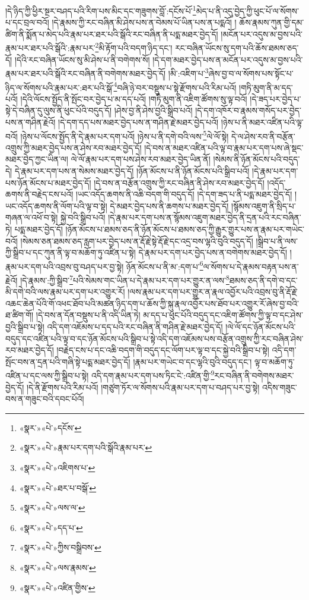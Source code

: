 །དེ་ཉིད་ཀྱི་ཕྱིར་སྔར་བཤད་པའི་རིག་པས་མིང་དང་གཟུགས་བློ་:དངོས་པོ་\footnote{«སྣར་»«པེ་»དངོས་}མེད་པ་ནི་འདུ་བྱེད་ཀྱི་ཕུང་པོ་ལ་སོགས་པ་དང་བྲལ་བའོ། །དེ་རྣམས་ཀྱི་རང་བཞིན་མི་ཤེས་པས་ན་བེམས་པོ་ཡིན་པས་ན་པདྨའོ། །
ཆོས་རྣམས་ཀུན་གྱི་དམ་ཚིག་ནི་སྨོན་པ་མེད་པའི་རྣམ་པར་ཐར་པའི་སྒོའི་རང་བཞིན་ནི་པདྨ་མཐར་བྱེད་དོ། །མངོན་པར་འདུས་མ་བྱས་པའི་རྣམ་པར་ཐར་པའི་སྒོའི་:རྣམ་པར་\footnote{«སྣར་»«པེ་»རྣམ་པར་དག་པའི་སྒོའི་རྣམ་པར་}མི་རྟོག་པའི་བདག་ཉིད་དང་། རང་བཞིན་ཡོངས་སུ་དག་པའི་ཆོས་ཐམས་ཅད་དོ། །དེའི་རང་བཞིན་ཡོངས་སུ་མི་ཤེས་པ་ནི་བགེགས་སོ། །དེ་དག་མཐར་བྱེད་པས་ན་མངོན་པར་འདུས་མ་བྱས་པའི་རྣམ་པར་ཐར་པའི་སྒོའི་རང་བཞིན་ནི་བགེགས་མཐར་བྱེད་དོ། །མི་:འཇིག་པ་\footnote{«སྣར་»«པེ་»འཇིགས་པ་}ཞེས་བྱ་བ་ལ་སོགས་པས་སྟོང་པ་ཉིད་ལ་སོགས་པའི་རྣམ་པར་:ཐར་པའི་སྒོ་\footnote{«སྣར་»«པེ་»ཐར་པ་བསྒོ་}བཞི་ཉེ་བར་བསྡུས་པ་སྟེ་རྫོགས་པའི་རིམ་པའོ། །གཏི་མུག་ནི་མ་དད་པའོ། །དེའི་ལོངས་སྤྱོད་ནི་སྤོང་བར་བྱེད་པ་མ་དད་པའོ། །གཏི་མུག་ནི་འཇིག་ཚོགས་སུ་ལྟ་བའོ། །དེ་ཟད་པར་བྱེད་པ་སྟེ་དེ་བཞིན་དུ་ལུས་ནི་ཕུང་པོའི་བདུད་དོ། །ཤེས་བྱ་ནི་ཤེས་བྱའི་སྒྲིབ་པའོ། །དེ་དག་འཁོར་བ་རྣམས་གསོད་པར་བྱེད་པས་ན་གཤིན་རྗེའོ། །དེ་དག་དད་པས་མཐར་བྱེད་པས་ན་གཤིན་རྗེ་མཐར་བྱེད་པའོ། །ཉེས་པ་ནི་མཐར་འཛིན་པའི་ལྟ་བའོ། །ཉེས་པ་ལོངས་སྤྱོད་ནི་དེ་རྣམ་པར་དག་པའོ། །ཉེས་པ་ནི་དགེ་བའི་ལས་\footnote{«སྣར་»«པེ་»ལས་ལ་}ལེ་ལོ་སྟེ། དེ་ལ་ཤེས་རབ་ནི་བརྩོན་འགྲུས་ཀྱི་མཐར་བྱེད་པས་ན་ཤེས་རབ་མཐར་བྱེད་དོ། །དེ་བས་ན་མཐར་འཛིན་པའི་ལྟ་བ་རྣམ་པར་དག་པས་ཞེ་སྡང་མཐར་བྱེད་ཀྱང་ཡིན་ལ། ལེ་ལོ་རྣམ་པར་དག་པས་ཤེས་རབ་མཐར་བྱེད་ཡིན་ནོ། །སེམས་ནི་ཉོན་མོངས་པའི་བདུད་དེ། དེ་རྣམ་པར་དག་པས་ན་སེམས་མཐར་བྱེད་དོ། །ཉོན་མོངས་པ་ནི་ཉོན་མོངས་པའི་སྒྲིབ་པའོ། །དེ་རྣམ་པར་དག་པས་ཉོན་མོངས་པ་མཐར་བྱེད་དོ། །དེ་བས་ན་བརྩོན་འགྲུས་ཀྱི་རང་བཞིན་ནི་ཤེས་རབ་མཐར་བྱེད་དོ། །འདོད་ཆགས་ནི་བརྗེད་ངས་པའོ། །ཡང་འདོད་ཆགས་ནི་འཆི་བདག་གི་བདུད་དོ། །དེ་དག་ཟད་པ་ནི་པདྨ་མཐར་བྱེད་དོ། །ཡང་འདོད་ཆགས་ནི་ལོག་པའི་ལྟ་བ་སྟེ། དེ་མཐར་བྱེད་པས་ནི་ཆགས་པ་མཐར་བྱེད་དོ། །སྙོམས་འཇུག་ནི་སྲིད་པ་གཞན་ལ་འཕོ་བ་སྟེ། སྐྱེ་བའི་སྒྲིབ་པའོ། །དེ་རྣམ་པར་དག་པས་ན་སྙོམས་འཇུག་མཐར་བྱེད་ནི་དྲན་པའི་རང་བཞིན་ཏེ། པདྨ་མཐར་བྱེད་དོ། །ཉོན་མོངས་པ་ཐམས་ཅད་ནི་ཉོན་མོངས་པ་ཐམས་ཅད་ཀྱི་རྒྱུར་གྱུར་པས་ན་རྣམ་པར་གཡེང་བའོ། །སེམས་ཅན་ཐམས་ཅད་རླག་པར་བྱེད་པས་ན་རྡོ་རྗེ་སྟེ་རྡོ་རྗེ་དང་འདྲ་བས་ལྷའི་བུའི་བདུད་དོ། །སྒྲིབ་པ་ནི་ལས་ཀྱི་སྒྲིབ་པ་དང་ཀུན་ནི་ལྟ་བ་མཆོག་ཏུ་འཛིན་པ་སྟེ། དེ་རྣམ་པར་དག་པར་བྱེད་པས་ན་བགེགས་མཐར་བྱེད་དོ། །རྣམ་པར་དག་པའི་འབྲས་བུ་བཤད་པར་བྱ་སྟེ། ཉོན་མོངས་པ་ནི་མ་:དག་པ་\footnote{«སྣར་»«པེ་»དད་པ་}ལ་སོགས་པ་དེ་རྣམས་བརྟན་པས་ན་རྗེའོ། །དེ་རྣམས་:ཀྱི་སྒྲིབ་\footnote{«སྣར་»«པེ་»ཀྱིས་བསྒྲིབས་}པའི་སེམས་གང་ཡིན་པ་དེ་རྣམ་པར་དག་པར་གྱུར་ན་ལས་\footnote{«སྣར་»«པེ་»ལས་རྣམས་}ཐམས་ཅད་ནི་དགེ་བ་དང་མི་དགེ་བའི་ལས་རྣམ་པར་དག་པར་འགྱུར་རོ། །ལས་རྣམ་པར་དག་པར་གྱུར་ན་རྣལ་འབྱོར་པའི་འབྲས་བུ་ནི་རྡོ་རྗེ་འཆང་ཆེན་པོའི་གོ་འཕང་ཐོབ་པའི་མཚན་ཉིད་དག་པ་ཆོས་ཀྱི་སྐུ་རྣལ་འབྱོར་པས་ཐོབ་པར་འགྱུར་རོ་ཞེས་བྱ་བའི་ཐ་ཚིག་གོ། །དེ་བས་ན་དོན་བསྡུས་པ་ནི་འདི་ཡིན་ཏེ། མ་དད་པ་ཕུང་པོའི་བདུད་དང་འཇིག་ཚོགས་ཀྱི་ལྟ་བ་དང་ཤེས་བྱའི་སྒྲིབ་པ་སྟེ། འདི་དག་འཇོམས་པ་དད་པའི་རང་བཞིན་ནི་གཤིན་རྗེ་མཐར་བྱེད་དོ། །ལེ་ལོ་དང་ཉོན་མོངས་པའི་བདུད་དང་འཛིན་པའི་ལྟ་བ་དང་ཉོན་མོངས་པའི་སྒྲིབ་པ་སྟེ་འདི་དག་འཇོམས་པས་བརྩོན་འགྲུས་ཀྱི་རང་བཞིན་ཤེས་རབ་མཐར་བྱེད་དོ། །བརྗེད་ངས་པ་དང་འཆི་བདག་གི་བདུད་དང་ལོག་པར་ལྟ་བ་དང་སྐྱེ་བའི་སྒྲིབ་པ་སྟེ། འདི་དག་སྤོང་བས་ན་དྲན་པའི་གཞི་སྟེ་པདྨ་མཐར་བྱེད་དོ། །རྣམ་པར་གཡེང་བ་དང་ལྷའི་བུའི་བདུད་དང་། ལྟ་བ་མཆོག་ཏུ་འཛིན་པ་དང་ལས་ཀྱི་སྒྲིབ་པ་སྟེ། འདི་དག་རྣམ་པར་དག་པས་ཏིང་ངེ་:འཛིན་གྱི་\footnote{«སྣར་»«པེ་»འཛིན་གྱིས་}རང་བཞིན་ནི་བགེགས་མཐར་བྱེད་དོ། །དེ་ནི་རྫོགས་པའི་རིམ་པའོ། །གཙུག་ཏོར་ལ་སོགས་པའི་རྣམ་པར་དག་པ་བཤད་པར་བྱ་སྟེ། འདིས་གཟུང་བས་ན་གཟུང་བའི་དབང་པོའོ། 